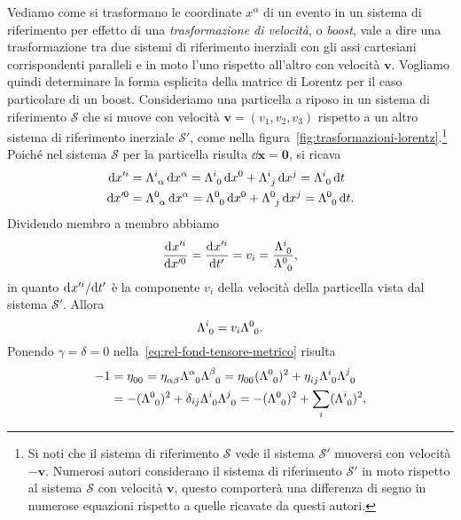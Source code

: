 Vediamo come si trasformano le coordinate $x^{\alpha}$ di un evento in un
sistema di riferimento per effetto di una \emph{trasformazione di velocità}, o
\emph{boost}, vale a dire una trasformazione tra due sistemi di
riferimento inerziali con gli assi cartesiani corrispondenti paralleli e in moto
l'uno rispetto all'altro con velocità $\bm{v}$.  Vogliamo quindi
determinare la forma esplicita della matrice di Lorentz per il caso particolare
di un boost.  Consideriamo una particella a riposo in un sistema di riferimento
$\mathcal{S}$ che si muove con velocità $\bm{v} = (v_{1},v_{2},v_{3})$ rispetto
a un altro sistema di riferimento inerziale $\mathcal{S}'$, come nella
figura~\ref{fig:trasformazioni-lorentz}.\footnote{Si noti che il sistema di
  riferimento $\mathcal{S}$ vede il sistema $\mathcal{S}'$ muoversi con velocità
  $-\bm{v}$.  Numerosi autori considerano il sistema di riferimento
  $\mathcal{S}'$ in moto rispetto al sistema $\mathcal{S}$ con velocità
  $\bm{v}$, questo comporterà una differenza di segno in numerose equazioni
  rispetto a quelle ricavate da questi autori.}
Poiché nel sistema $\mathcal{S}$ per la particella risulta $\dd\bm{x} = \bm{0}$,
si ricava
\begin{subequations}
  \begin{align}
    \dd x'^{i} &= \tensor{\Lambda}{^{i}_{\alpha}}\dd x^{\alpha} =
    \tensor{\Lambda}{^{i}_{0}}\dd x^{0} + \tensor{\Lambda}{^{i}_{j}}\dd x^{j} =
    \tensor{\Lambda}{^{i}_{0}}\dd t \\
    \dd x'^{0} &= \tensor{\Lambda}{^{0}_{\alpha}}\dd x^{\alpha} =
    \tensor{\Lambda}{^{0}_{0}}\dd x^{0} + \tensor{\Lambda}{^{0}_{j}}\dd x^{j} =
    \tensor{\Lambda}{^{0}_{0}}\dd t.
  \end{align}
\end{subequations}
Dividendo membro a membro abbiamo
\begin{equation}
  \toder{x'^{i}}{x'^{0}} = \toder{x'^{i}}{t'} = v_{i} =
  \frac{\tensor{\Lambda}{^{i}_{0}}}{\tensor{\Lambda}{^{0}_{0}}},
\end{equation}
in quanto $\mathrm{d}^{}x'^{i} / \mathrm{d} {t'}^{}$ è la componente $v_{i}$ della velocità della
particella vista dal sistema $\mathcal{S}'$.  Allora
\begin{equation}
  \tensor{\Lambda}{^{i}_{0}} = v_{i}\tensor{\Lambda}{^{0}_{0}}.
\end{equation}
Ponendo $\gamma = \delta = 0$ nella~\eqref{eq:rel-fond-tensore-metrico} risulta
\begin{equation}
  \begin{split}
    -1 &= \tensor{\eta}{_{00}} = \tensor{\eta}{_{\alpha\beta}}
    \tensor{\Lambda}{^{\alpha}_{0}} \tensor{\Lambda}{^{\beta}_{0}} =
    \tensor{\eta}{_{00}}(\tensor{\Lambda}{^{0}_{0}})^{2} + \tensor{\eta}{_{ij}}
    \tensor{\Lambda}{^{i}_{0}} \tensor{\Lambda}{^{j}_{0}}
    \\
    &= -(\tensor{\Lambda}{^{0}_{0}})^{2} + \delta_{ij}
    \tensor{\Lambda}{^{i}_{0}} \tensor{\Lambda}{^{j}_{0}} =
    -(\tensor{\Lambda}{^{0}_{0}})^{2}+\sum_{i}(\tensor{\Lambda}{^{i}_{0}})^{2},
  \end{split}
\end{equation}

